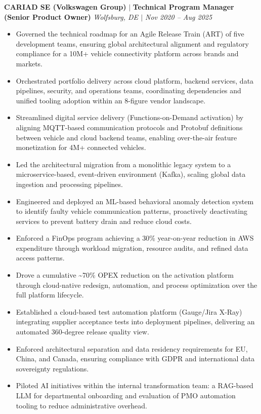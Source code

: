 \documentclass[a4paper,10pt]{article}
\begin{document}
\vspace{6pt}
\textbf{CARIAD SE (Volkswagen Group)} $|$ \textbf{Technical Program Manager (Senior Product Owner)} \hfill \textit{Wolfsburg, DE $|$ Nov 2020 -- Aug 2025}
\begin{itemize}
\item Governed the technical roadmap for an Agile Release Train (ART) of five development teams, ensuring global architectural alignment and regulatory compliance for a 10M+ vehicle connectivity platform across brands and markets.
\item Orchestrated portfolio delivery across cloud platform, backend services, data pipelines, security, and operations teams, coordinating dependencies and unified tooling adoption within an 8-figure vendor landscape.
\item Streamlined digital service delivery (Functions-on-Demand activation) by aligning MQTT-based communication protocols and Protobuf definitions between vehicle and cloud backend teams, enabling over-the-air feature monetization for 4M+ connected vehicles.
\item Led the architectural migration from a monolithic legacy system to a microservice-based, event-driven environment (Kafka), scaling global data ingestion and processing pipelines.
\item Engineered and deployed an ML-based behavioral anomaly detection system to identify faulty vehicle communication patterns, proactively deactivating services to prevent battery drain and reduce cloud costs.
\item Enforced a FinOps program achieving a 30\% year-on-year reduction in AWS expenditure through workload migration, resource audits, and refined data access patterns.
\item Drove a cumulative \textasciitilde{}70\% OPEX reduction on the activation platform through cloud-native redesign, automation, and process optimization over the full platform lifecycle.
\item Established a cloud-based test automation platform (Gauge/Jira X-Ray) integrating supplier acceptance tests into deployment pipelines, delivering an automated 360-degree release quality view.
\item Enforced architectural separation and data residency requirements for EU, China, and Canada, ensuring compliance with GDPR and international data sovereignty regulations.
\item Piloted AI initiatives within the internal transformation team: a RAG-based LLM for departmental onboarding and evaluation of PMO automation tooling to reduce administrative overhead.
\end{itemize}
\end{document}
